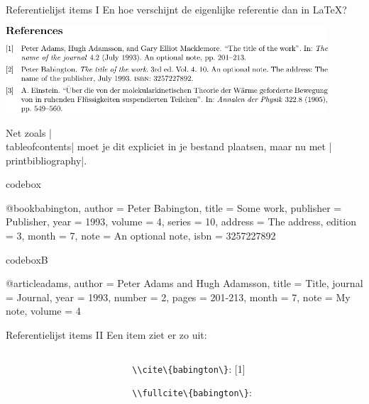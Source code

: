 \documentclass[presentatie.tex]{subfiles}
\begin{document}
\begin{frame}{Referentielijst items I}
	En hoe verschijnt de eigenlijke referentie dan in \LaTeX?
	
	\begin{center}
		\includegraphics[width=0.9\textwidth]{assets/6_Bibliografie/snippetReferences/snippetReferences.pdf}
	\end{center}
	
	Net zoals \hll|\\tableofcontents| moet je dit expliciet in je bestand plaatsen, maar nu met
	\hll|\\printbibliography|.
\end{frame}



\begin{saveblock}{codebox}
	\begin{highlightblock}[linewidth=0.55\textwidth]
		@book{babington,
			author = {Peter Babington},
			title = {Some work},
			publisher = {Publisher},
			year = 1993,
			volume = 4,
			series = 10,
			address = {The address},
			edition = 3,
			month = 7,
			note = {An optional note},
			isbn = {3257227892}
		}
	\end{highlightblock}
\end{saveblock}

\begin{saveblock}{codeboxB}
	\begin{highlightblock}[linewidth=0.55\textwidth]
		@article{adams,
			author  = {Peter Adams
				and Hugh Adamsson},
			title   = {Title},
			journal = {Journal},
			year    = 1993,
			number  = 2,
			pages   = {201-213},
			month   = 7,
			note    = {My note}, 
			volume  = 4
		}
	\end{highlightblock}
\end{saveblock}

\begin{frame}{Referentielijst items II}
	Een item ziet er zo uit:
	
	\begin{columns}
		\begin{column}{0.55\textwidth}
		\end{column}
		\begin{column}{0.35\textwidth}%
			\lstinline|\\cite\{babington\}|: [1]
			
			\lstinline|\\fullcite\{babington\}|:\\
		\end{column}
	\end{columns}
\end{frame}
\end{document}
